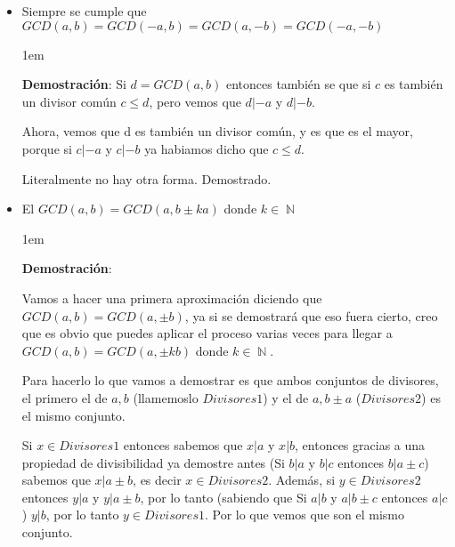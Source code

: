 \documentclass[12pt, fleqn]{report}                             %
\newenvironment{SmallIndentation}[1][0.75em]                    %
    {\begin{adjustwidth}{#1}{}\begin{footnotesize}}                 %
    {\end{footnotesize}\end{adjustwidth}}                           %
\DeclareMathOperator \Naturals  {\mathbb{N}}                     %
\begin{document}
\begin{itemize}
\begin{SmallIndentation}[1em]
                    \end{SmallIndentation} 


                \clearpage

                \item Siempre se cumple que $GCD(a,b) = GCD(-a,b) = GCD(a,-b) = GCD(-a,-b)$

                    \begin{SmallIndentation}[1em]
                        \textbf{Demostración}:
                        Si $d= GCD(a,b)$ entonces también se que si $c$ es también un divisor común
                        $c\leq d$, pero vemos que $d|-a$ y $d|-b$.

                        Ahora, vemos que d es también un divisor común, y es que es el mayor, porque
                        si $c|-a$ y $c|-b$ ya habiamos dicho que $c\leq d$.

                        Literalmente no hay otra forma. Demostrado.

                    \end{SmallIndentation} 


                \item El $GCD(a,b) = GCD(a, b \pm ka)$ donde $k \in \Naturals$

                    \begin{SmallIndentation}[1em]
                        \textbf{Demostración}:
                        
                        Vamos a hacer una primera aproximación diciendo que $GCD(a,b)=GCD(a,\pm b)$, ya 
                        si se demostrará que eso fuera cierto, creo que es obvio que puedes aplicar el 
                        proceso varias veces para llegar a $GCD(a,b) = GCD(a, \pm kb)$ donde
                        $k \in \Naturals$.

                        Para hacerlo lo que vamos a demostrar es que ambos conjuntos de divisores, el
                        primero el de $a,b$ (llamemoslo $Divisores1$) y el de $a, b \pm a$ ($Divisores2$)
                        es el mismo conjunto.

                        Si $x \in Divisores1$ entonces sabemos que $x|a$ y $x|b$, entonces gracias a una
                        propiedad de divisibilidad ya demostre antes (Si $b|a$ y $b|c$ entonces $b|a\pm c$)
                        sabemos que $x|a \pm b$, es decir $x \in Divisores2$. Además, si $y \in Divisores2$
                        entonces $y|a$ y $y|a \pm b$, por lo tanto (sabiendo que Si $a|b$ y $a|b \pm c$
                        entonces $a|c$) $y|b$, por lo tanto $y \in Divisores1$. Por lo que vemos que son el
                        mismo conjunto.


\end{SmallIndentation}
\end{itemize}
\end{document}
